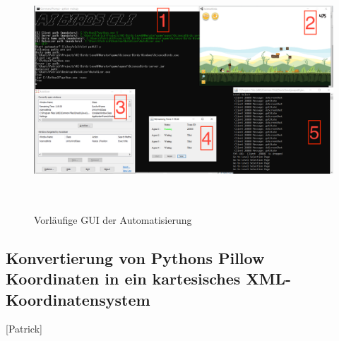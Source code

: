 \begin{figure}
	\centering
	\includegraphics[height=9cm, width=16cm, clip]{img/automator_screen.png}
	\caption{Vorläufige GUI der Automatisierung}
\end{figure}
\subsection{Konvertierung von Pythons Pillow Koordinaten in ein kartesisches XML-Koordinatensystem}
[Patrick]
